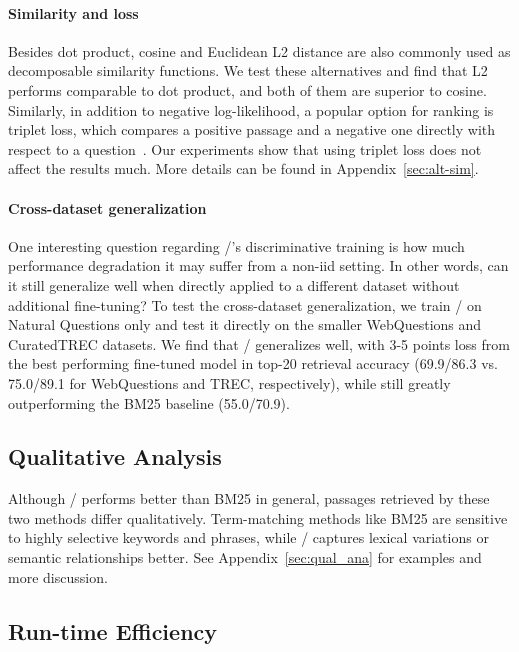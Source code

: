 \paragraph{Similarity and loss}
\label{sec:sim_loss}
Besides dot product, cosine and Euclidean L2 distance are also commonly used as decomposable similarity functions.
We test these alternatives and find that L2 performs comparable to dot product, and both of them are superior to cosine.
Similarly, in addition to negative log-likelihood, a popular option for ranking is triplet loss, which compares a positive passage and a negative one directly with respect to a question~\cite{burges2005learning}.
Our experiments show that using triplet loss does not affect the results much.
More details can be found in Appendix~\ref{sec:alt-sim}. %


\paragraph{Cross-dataset generalization}
One interesting question regarding \model/'s discriminative training is how much performance degradation it may suffer from a non-iid setting. In other words, can it still generalize well when directly applied to a different dataset without additional fine-tuning? To test the cross-dataset generalization, we train \model/ on Natural Questions only and test it directly on the smaller WebQuestions and CuratedTREC datasets. We find that \model/ generalizes well, with 3-5 points loss from the best performing fine-tuned model in top-20 retrieval accuracy (69.9/86.3 vs. 75.0/89.1 for WebQuestions and TREC, respectively), while still greatly outperforming the BM25 baseline (55.0/70.9).









\subsection{Qualitative Analysis}

Although \model/ performs better than BM25 in general, passages retrieved by these two methods differ qualitatively. 
Term-matching methods like BM25 are sensitive to highly selective keywords and phrases, while \model/ captures lexical variations or semantic relationships better.
See Appendix~\ref{sec:qual_ana} for examples and more discussion.


\subsection{Run-time Efficiency}
\label{sec:efficiency}

